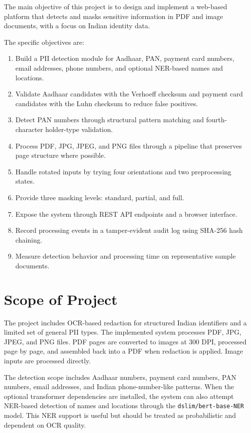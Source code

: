 The main objective of this project is to design and implement a web-based platform that detects and masks sensitive information in PDF and image documents, with a focus on Indian identity data.

The specific objectives are:

\begin{enumerate}
    \item Build a PII detection module for Aadhaar, PAN, payment card numbers, email addresses, phone numbers, and optional NER-based names and locations.
    \item Validate Aadhaar candidates with the Verhoeff checksum and payment card candidates with the Luhn checksum to reduce false positives.
    \item Detect PAN numbers through structural pattern matching and fourth-character holder-type validation.
    \item Process PDF, JPG, JPEG, and PNG files through a pipeline that preserves page structure where possible.
    \item Handle rotated inputs by trying four orientations and two preprocessing states.
    \item Provide three masking levels: standard, partial, and full.
    \item Expose the system through REST API endpoints and a browser interface.
    \item Record processing events in a tamper-evident audit log using SHA-256 hash chaining.
    \item Measure detection behavior and processing time on representative sample documents.
\end{enumerate}

\section{Scope of Project}

The project includes OCR-based redaction for structured Indian identifiers and a limited set of general PII types. The implemented system processes PDF, JPG, JPEG, and PNG files. PDF pages are converted to images at 300 DPI, processed page by page, and assembled back into a PDF when redaction is applied. Image inputs are processed directly.

The detection scope includes Aadhaar numbers, payment card numbers, PAN numbers, email addresses, and Indian phone-number-like patterns. When the optional transformer dependencies are installed, the system can also attempt NER-based detection of names and locations through the \texttt{dslim/bert-base-NER} model. This NER support is useful but should be treated as probabilistic and dependent on OCR quality.

